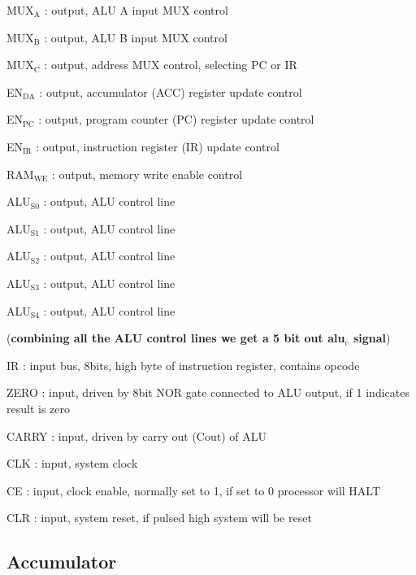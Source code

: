 \documentclass[11pt]{article}
\begin{document}
MUX\(_{\text{A}}\) : output, ALU A input MUX control

MUX\(_{\text{B}}\) : output, ALU B input MUX control 

MUX\(_{\text{C}}\) : output, address MUX control, selecting PC or IR 

EN\(_{\text{DA}}\) : output, accumulator (ACC) register update control 

EN\(_{\text{PC}}\) : output, program counter (PC) register update control 

EN\(_{\text{IR}}\) : output, instruction register (IR) update control 

RAM\(_{\text{WE}}\) : output, memory write enable control 

ALU\(_{\text{S0}}\) : output, ALU control line 

ALU\(_{\text{S1}}\) : output, ALU control line

ALU\(_{\text{S2}}\) : output, ALU control line 

ALU\(_{\text{S3}}\) : output, ALU control line 

ALU\(_{\text{S4}}\) : output, ALU control line

(\textbf{combining all the ALU control lines we get a 5 bit out alu\(_{\text{c}}\) signal}) 

IR : input bus, 8bits, high byte of instruction register, contains opcode 

ZERO : input, driven by 8bit NOR gate connected to ALU output, if 1 indicates result is zero 

CARRY : input, driven by carry out (Cout) of ALU 

CLK : input, system clock 

CE : input, clock enable, normally set to 1, if set to 0 processor will HALT 

CLR : input, system reset, if pulsed high system will be reset 

\subsection{Accumulator}
\label{sec:org913882c}
\end{document}
